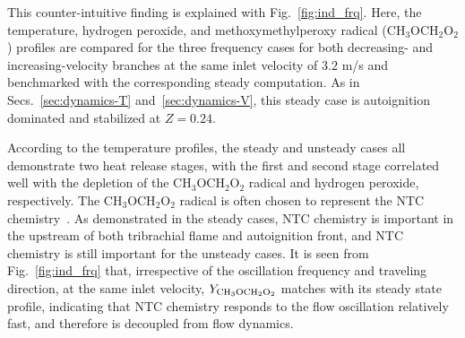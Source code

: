 \begin{table}
  \caption{Induction time at different harmonic oscillation frequencies.  The definition of the induction time is illustrated in Fig.~\ref{fig:sd_hys}}
  \label{table:ind}
  \centering
  \normalsize
\end{table}

This counter-intuitive finding is explained with Fig.~\ref{fig:ind_frq}.  Here, the temperature, hydrogen peroxide, and methoxymethylperoxy radical (CH$_3$OCH$_2$O$_2$) profiles are compared for the three frequency cases for both decreasing- and increasing-velocity branches at the same inlet velocity of $3.2$ m/s and benchmarked with the corresponding steady computation.  As in Secs.~\ref{sec:dynamics-T} and~\ref{sec:dynamics-V}, this steady case is autoignition dominated and stabilized at $Z = 0.24$.  

According to the temperature profiles, the steady and unsteady cases all demonstrate two heat release stages, with the first and second stage correlated well with the depletion of the CH$_3$OCH$_2$O$_2$ radical and hydrogen peroxide, respectively.  The CH$_3$OCH$_2$O$_2$ radical is often chosen to represent the NTC chemistry~\cite{krisman15}.  As demonstrated in the steady cases, NTC chemistry is important in the upstream of both tribrachial flame and autoignition front, and NTC chemistry is still important for the unsteady cases.  It is seen from Fig.~\ref{fig:ind_frq} that, irrespective of the oscillation frequency and traveling direction, at the same inlet velocity, $Y_{\rm CH_3OCH_2O_2}$ matches with its steady state profile, indicating that NTC chemistry responds to the flow oscillation relatively fast, and therefore is decoupled from flow dynamics.


